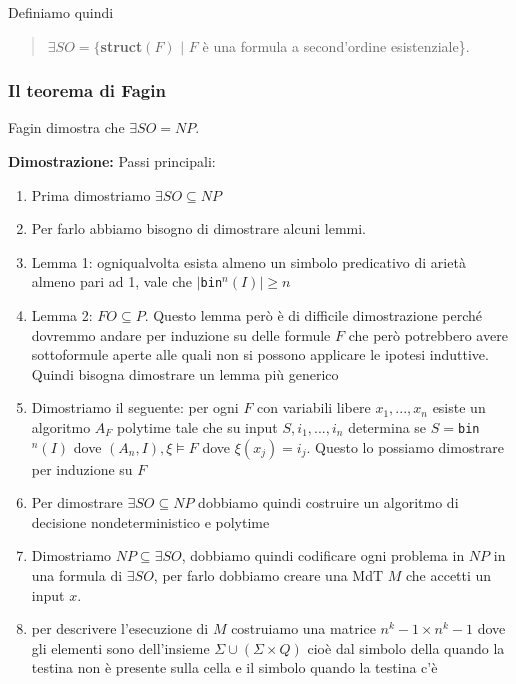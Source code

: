 \documentclass{article}
\begin{document}
\bigskip

Definiamo quindi
\begin{quote}
$\exists SO =\{$\textbf{struct}$(F)\,\,|\,\,F$ è una formula a second'ordine esistenziale\}.
\end{quote}

\subsubsection{Il teorema di Fagin}
Fagin dimostra che $\exists SO = NP$.

\bigskip

\textbf{Dimostrazione:} Passi principali:
\begin{enumerate}
    \item Prima dimostriamo $\exists SO\subseteq NP$
    \item Per farlo abbiamo bisogno di dimostrare alcuni lemmi.
    \item Lemma 1: ogniqualvolta esista almeno un simbolo predicativo di arietà almeno pari ad 1, vale che $|$\verb|bin|$^n(I)|\geq n$
    \item Lemma 2: $FO\subseteq P$. Questo lemma però è di difficile dimostrazione perché dovremmo andare per induzione su delle formule $F$ che però potrebbero avere sottoformule aperte alle quali non si possono applicare le ipotesi induttive. Quindi bisogna dimostrare un lemma più generico
    \item Dimostriamo il seguente: per ogni $F$ con variabili libere $x_1,...,x_n$ esiste un algoritmo $A_F$ polytime tale che su input $S,i_1,...,i_n$ determina se $S=$\verb|bin|$^n(I)$ dove $(A_n,I),\xi\vDash F$ dove $\xi(x_j) =i_j$. Questo lo possiamo dimostrare per induzione su $F$
    \item Per dimostrare $\exists SO\subseteq NP$ dobbiamo quindi costruire un algoritmo di decisione nondeterministico e polytime
    \item Dimostriamo $NP\subseteq \exists SO$, dobbiamo quindi codificare ogni problema in $NP$ in una formula di $\exists SO$, per farlo dobbiamo creare una MdT $M$ che accetti un input $x$.
    \item per descrivere l'esecuzione di $M$ costruiamo una matrice $n^k-1\times n^k-1$ dove gli elementi sono dell'insieme $\Sigma \cup (\Sigma \times Q)$ cioè dal simbolo della quando la testina non è presente sulla cella e il simbolo quando la testina c'è
\end{enumerate}
\end{document}
